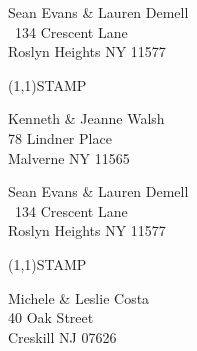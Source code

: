 \documentclass[12pt]{article}
\begin{document}
\begin{minipage}{.5\linewidth} \noindent
Sean Evans \& Lauren Demell\\\ 
134 Crescent Lane\\ 
Roslyn Heights NY 11577
\end{minipage}
\begin{minipage}{.5\linewidth \hspace{-.2in} \vspace{-.3in}}
\begin{flushright}
\framebox(1,1){STAMP}
\end{flushright}
\end{minipage}

\begin{center} \begin{Huge} \vspace*{\fill}
Kenneth \& Jeanne Walsh\\
78 Lindner Place\\
Malverne NY 11565\\
\vspace{\fill} \end{Huge} \end{center}

\clearpage

\begin{minipage}{.5\linewidth} \noindent
Sean Evans \& Lauren Demell\\\ 
134 Crescent Lane\\ 
Roslyn Heights NY 11577
\end{minipage}
\begin{minipage}{.5\linewidth \hspace{-.2in} \vspace{-.3in}}
\begin{flushright}
\framebox(1,1){STAMP}
\end{flushright}
\end{minipage}

\begin{center} \begin{Huge} \vspace*{\fill}
Michele \& Leslie Costa\\
40 Oak Street\\
Creskill NJ 07626\\
\vspace{\fill} \end{Huge} \end{center}

\clearpage
\end{document}
